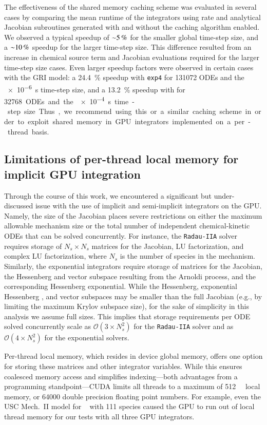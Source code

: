 \documentclass[preprint]{elsarticle}
\begin{document}
The effectiveness of the shared memory caching scheme was evaluated in several cases by comparing the mean runtime of the integrators using rate and analytical Jacobian subroutines generated with and without the caching algorithm enabled.
We observed a typical speedup of $\SI{\sim5}{\percent}$ for the smaller global time-step size, and a $\SI{\sim10}{\percent}$ speedup for the larger time-step size.
This difference resulted from an increase in chemical source term and Jacobian evaluations required for the larger time-step size cases.
Even larger speedup factors were observed in certain cases with the GRI model: a \SI{24.4}{\percent} speedup with \texttt{exp4} for \num{131072} ODEs and the \SI{e-6}{\second} time-step size, and a \SI{13.2}{\percent} speedup with  for \SI{32768} ODEs and the \SI{e-4}{\second} time-step size.
Thus, we recommend using this or a similar caching scheme in order to exploit shared memory in GPU integrators implemented on a per-thread basis.

\subsection{Limitations of per-thread local memory for implicit GPU integration}

Through the course of this work, we encountered a significant but under-discussed issue with the use of implicit and semi-implicit integrators on the GPU.
Namely, the size of the Jacobian places severe restrictions on either the maximum allowable mechanism size or the total number of independent chemical-kinetic ODEs that can be solved concurrently.
For instance, the \texttt{Radau-IIA} solver requires storage of $N_s \times N_s$ matrices for the Jacobian, LU factorization, and complex LU factorization, where $N_s$ is the number of species in the mechanism.
Similarly, the exponential integrators require storage of matrices for the Jacobian, the Hessenberg and vector subspace resulting from the Arnoldi process, and the corresponding Hessenberg exponential.
While the Hessenberg, exponential Hessenberg , and vector subspaces may be smaller than the full Jacobian (e.g., by limiting the maximum Krylov subspace size), for the sake of simplicity in this analysis we assume full sizes.
This implies that storage requirements per ODE solved concurrently scale as $\mathcal{O}\left(3 \times N_s^2\right)$ for the \texttt{Radau-IIA} solver and as $\mathcal{O}\left(4 \times N_s^2\right)$ for the exponential solvers.

Per-thread local memory, which resides in device global memory, offers one option for storing these matrices and other integrator variables.
While this ensures coalesced memory access and simplifies indexing---both advantages from a programming standpoint---CUDA limits all threads to a maximum of \SI{512}{\kilo\byte} local memory, or \num{64000} double precision floating point numbers.
For example, even the USC Mech.~II model for ~\cite{Wang:2007} with 111 species caused the GPU to run out of local thread memory for our tests with all three GPU integrators.
\end{document}
